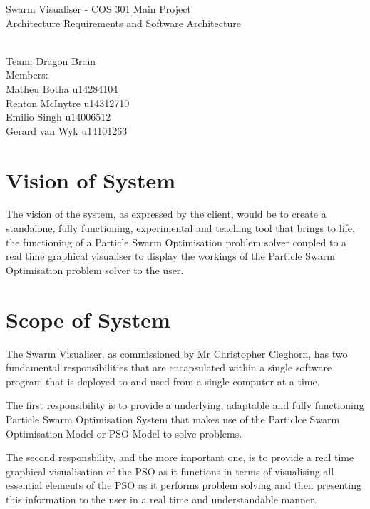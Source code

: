 \documentclass[11pt]{article}
\begin{document}
\begin{titlepage}

\begin{center}
\begin{huge}
Swarm Visualiser - COS 301 Main Project
\\
Architecture Requirements and Software Architecture
\begin{small}
\\
Team: Dragon Brain
\\
Members:
\\
Matheu Botha u14284104
\\
Renton McInytre u14312710
\\
Emilio Singh u14006512
\\
Gerard van Wyk u14101263

\end{small}

\end{huge}
\end{center}
\end{titlepage}

\pagebreak

\tableofcontents

\pagebreak
\section{Vision of System}
The vision of the system, as expressed by the client, would be to create a standalone, fully functioning, experimental and teaching tool that brings to life, the functioning of a Particle Swarm Optimisation problem solver coupled to a real time graphical visualiser to display the workings of the Particle Swarm Optimisation problem solver to the user.

\section{Scope of System}
The Swarm Visualiser, as commissioned by Mr Christopher Cleghorn, has two fundamental responsibilities that are encapsulated within a single software program that is deployed to and used from a single computer at a time.

The first responsibility is to provide a underlying, adaptable and fully functioning Particle Swarm Optimisation System that makes use of the Particlce Swarm Optimisation Model or PSO Model to solve problems.

The second responsbility, and the more important one, is to provide a real time graphical visualisation of the PSO as it functions in terms of visualising all essential elements of the PSO as it performs problem solving and then presenting this information to the user in a real time and understandable manner.
\end{document}
